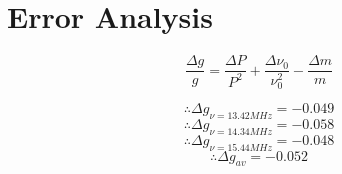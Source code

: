 \section{Error Analysis}

    $$\frac{\Delta g}{g} = \frac{\Delta P}{P^2} + \frac{\Delta \nu_0}{\nu_0^2} - \frac{\Delta m}{m}$$

    $$\therefore \Delta g_{\nu = 13.42MHz} = -0.049$$
    $$\therefore \Delta g_{\nu = 14.34MHz} = -0.058$$
    $$\therefore \Delta g_{\nu = 15.44MHz} = -0.048$$
    $$\therefore \Delta g_{av} = -0.052$$

    \begin{center}\end{center}